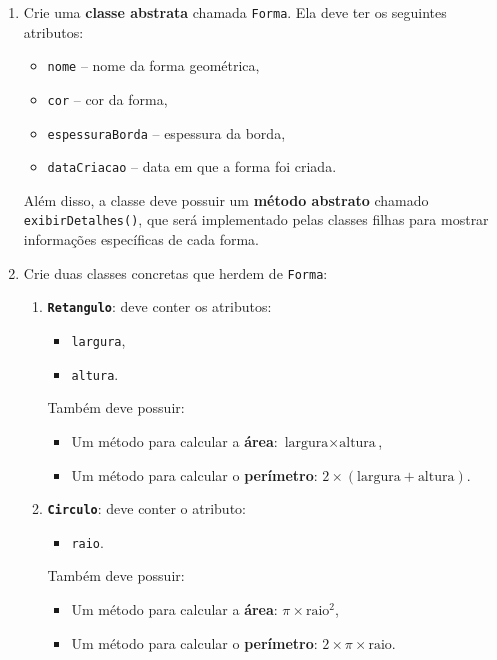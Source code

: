 \documentclass{article}
\begin{document}
\begin{enumerate}
    \item Crie uma \textbf{classe abstrata} chamada \texttt{Forma}.  
    Ela deve ter os seguintes atributos:
    \begin{itemize}
        \item \texttt{nome} -- nome da forma geométrica,
        \item \texttt{cor} -- cor da forma,
        \item \texttt{espessuraBorda} -- espessura da borda,
        \item \texttt{dataCriacao} -- data em que a forma foi criada.
    \end{itemize}
    
    Além disso, a classe deve possuir um \textbf{método abstrato} chamado \texttt{exibirDetalhes()}, 
    que será implementado pelas classes filhas para mostrar informações específicas de cada forma.

    \item Crie duas classes concretas que herdem de \texttt{Forma}:
    \begin{enumerate}
        \item \textbf{\texttt{Retangulo}}: deve conter os atributos:
        \begin{itemize}
            \item \texttt{largura},
            \item \texttt{altura}.
        \end{itemize}
        
        Também deve possuir:
        \begin{itemize}
            \item Um método para calcular a \textbf{área}: \(\text{largura} \times \text{altura}\),
            \item Um método para calcular o \textbf{perímetro}: \(2 \times (\text{largura} + \text{altura})\).
        \end{itemize}

        \item \textbf{\texttt{Circulo}}: deve conter o atributo:
        \begin{itemize}
            \item \texttt{raio}.
        \end{itemize}
        
        Também deve possuir:
        \begin{itemize}
            \item Um método para calcular a \textbf{área}: \(\pi \times \text{raio}^2\),
            \item Um método para calcular o \textbf{perímetro}: \(2 \times \pi \times \text{raio}\).
        \end{itemize}
    \end{enumerate}


\end{enumerate}
\end{document}
